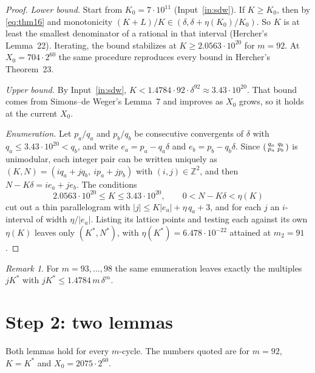\documentclass[11pt]{amsart}
\theoremstyle{definition}
\theoremstyle{remark}
\newtheorem{remark}[theorem]{Remark}
\newcommand{\Kst}{K^{*}}
\newcommand{\Nst}{N^{*}}
\begin{document}
\begin{proof}
\emph{Lower bound.} Start from $K_0 = 7\cdot 10^{11}$ (Input~\ref{in:sdw}). If $K \ge K_0$, then by
\eqref{eq:thm16} and monotonicity $(K+L)/K \in (\delta, \delta + \eta(K_0)/K_0)$. So $K$ is at least the
smallest denominator of a rational in that interval (Hercher's Lemma~22). Iterating, the bound
stabilizes at $K \ge 2.0563\cdot 10^{20}$ for $m = 92$. At $X_0 = 704\cdot 2^{60}$ the same procedure
reproduces every bound in Hercher's Theorem~23.

\emph{Upper bound.} By Input~\ref{in:sdw}, $K < 1.4784\cdot 92\cdot\delta^{92} \approx 3.43\cdot 10^{20}$.
That bound comes from Simons--de Weger's Lemma~7 and improves as $X_0$ grows, so it holds at the
current $X_0$.

\emph{Enumeration.} Let $p_a/q_a$ and $p_b/q_b$ be consecutive convergents of $\delta$ with
$q_a \le 3.43\cdot 10^{20} < q_b$, and write $e_a = p_a - q_a\delta$ and $e_b = p_b - q_b\delta$.
Since $\begin{psmallmatrix} q_a & q_b\\ p_a & p_b\end{psmallmatrix}$ is unimodular, each integer
pair can be written uniquely as $(K, N) = (i q_a + j q_b,\ i p_a + j p_b)$ with $(i,j)\in\mathbb Z^2$,
and then $N - K\delta = i e_a + j e_b$. The conditions
\[
  2.0563\cdot 10^{20} \le K \le 3.43\cdot 10^{20}, \qquad 0 < N - K\delta < \eta(K)
\]
cut out a thin parallelogram with $|j| \le K|e_a| + \eta\, q_a + 3$, and for each $j$ an
$i$-interval of width $\eta/|e_a|$. Listing its lattice points and testing each against its own
$\eta(K)$ leaves only $(\Kst, \Nst)$, with $\eta(\Kst) = 6.478\cdot 10^{-22}$ attained at $m_2 = 91$.
\end{proof}

\begin{remark}
For $m = 93, \dots, 98$ the same enumeration leaves exactly the multiples $j\Kst$ with
$j\Kst \le 1.4784\, m\, \delta^{m}$.
\end{remark}

\section{Step 2: two lemmas}\label{sec:lemmas}

Both lemmas hold for every $m$-cycle. The numbers quoted are for $m = 92$, $K = \Kst$ and
$X_0 = 2075\cdot 2^{60}$.
\end{document}
